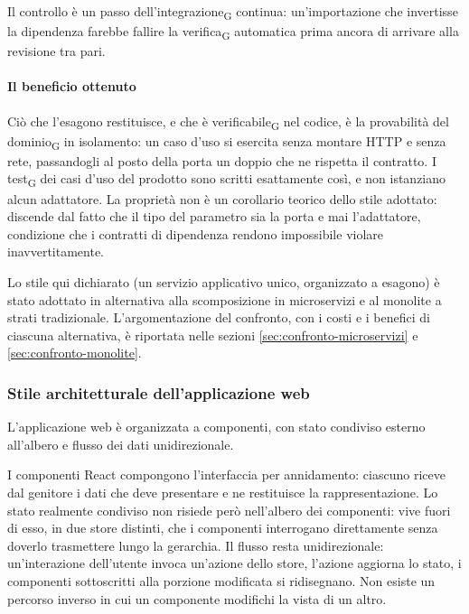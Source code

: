 \documentclass[a4paper, 10pt]{article}
\begin{document}
\noindent Il controllo è un passo dell'integrazione\textsubscript{G} continua: un'importazione che invertisse la dipendenza farebbe fallire la verifica\textsubscript{G} automatica prima ancora di arrivare alla revisione tra pari.

\paragraph{Il beneficio ottenuto}
Ciò che l'esagono restituisce, e che è verificabile\textsubscript{G} nel codice, è la provabilità del dominio\textsubscript{G} in isolamento: un caso d'uso si esercita senza montare HTTP e senza rete, passandogli al posto della porta un doppio che ne rispetta il contratto. I test\textsubscript{G} dei casi d'uso del prodotto sono scritti esattamente così, e non istanziano alcun adattatore. La proprietà non è un corollario teorico dello stile adottato: discende dal fatto che il tipo del parametro sia la porta e mai l'adattatore, condizione che i contratti di dipendenza rendono impossibile violare inavvertitamente.

\noindent Lo stile qui dichiarato (un servizio applicativo unico, organizzato a esagono) è stato adottato in alternativa alla scomposizione in microservizi e al monolite a strati tradizionale. L'argomentazione del confronto, con i costi e i benefici di ciascuna alternativa, è riportata nelle sezioni \ref{sec:confronto-microservizi} e \ref{sec:confronto-monolite}.

\subsubsection{Stile architetturale dell'applicazione web}
\label{sec:panoramica-stile-web}
L'applicazione web è organizzata a componenti, con stato condiviso esterno all'albero e flusso dei dati unidirezionale.

I componenti React compongono l'interfaccia per annidamento: ciascuno riceve dal genitore i dati che deve presentare e ne restituisce la rappresentazione. Lo stato realmente condiviso non risiede però nell'albero dei componenti: vive fuori di esso, in due store distinti, che i componenti interrogano direttamente senza doverlo trasmettere lungo la gerarchia. Il flusso resta unidirezionale: un'interazione dell'utente invoca un'azione dello store, l'azione aggiorna lo stato, i componenti sottoscritti alla porzione modificata si ridisegnano. Non esiste un percorso inverso in cui un componente modifichi la vista di un altro.
\end{document}

